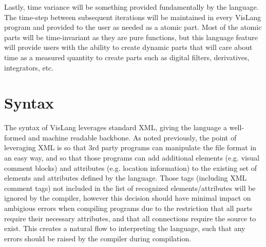 Lastly, time variance will be something provided fundamentally by the language.
The time-step between subsequent iterations will be maintained in every VisLang program
and provided to the user as needed as a atomic part. Most of the atomic parts will be
time-invariant as they are pure functions, but this language feature will provide users
with the ability to create dynamic parts that will care about time as a measured quantity
to create parts such as digital filters, derivatives, integrators, etc.

\section{Syntax}

The syntax of VisLang leverages standard XML, giving the language a well-formed and machine
readable backbone. As noted previously, the point of leveraging XML is so that 3rd party
programs can manipulate the file format in an easy way, and so that those programs can add
additional elements (e.g. visual comment blocks) and attributes (e.g. location information)
to the existing set of elements and attributes defined by the language. Those tags (including
XML comment tags) not included in the list of recognized elements/attributes will be 
ignored by the compiler, however this decision should have minimal impact on ambigious
errors when compiling programs due to the restriction that all parts require their necessary
attributes, and that all connections require the source to exist. This creates a natural
flow to interpreting the language, such that any errors should be raised by the compiler
during compilation. 

